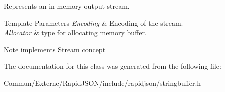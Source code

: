 Represents an in-\/memory output stream. 


\begin{DoxyTemplParams}{Template Parameters}
{\em Encoding} & Encoding of the stream. \\
\hline
{\em Allocator} & type for allocating memory buffer. \\
\hline
\end{DoxyTemplParams}
\begin{DoxyNote}{Note}
implements Stream concept 
\end{DoxyNote}


The documentation for this class was generated from the following file\+:\begin{DoxyCompactItemize}
\item 
Commun/\+Externe/\+Rapid\+J\+S\+O\+N/include/rapidjson/stringbuffer.\+h\end{DoxyCompactItemize}
